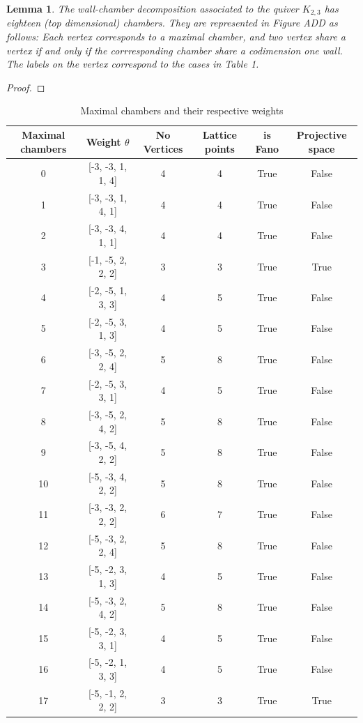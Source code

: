 \documentclass[11pt]{amsart}
\theoremstyle{plain}
\newtheorem{lemma}[theorem]{Lemma}
\theoremstyle{definition}
\begin{document}
\begin{lemma}\label{lemma:WallsDescription}
The wall-chamber decomposition associated to the quiver $K_{2,3}$ has eighteen (top dimensional) chambers. They are represented in Figure ADD as follows: Each vertex corresponds to a maximal chamber, and two vertex share a vertex if and only if the corrresponding chamber share a codimension one wall. The labels on the vertex correspond to the cases in Table 1.    
\end{lemma}
\begin{proof}
    
\end{proof}

\begin{table}[h]
\centering
\caption{
Maximal chambers and their respective weights
}
\renewcommand{\arraystretch}{1.5} 
\label{your-table-label}
\begin{tabular}{| c | c | c | c | c | c|}
\hline
Maximal chambers & Weight $\theta$ & No Vertices & Lattice points & 
is Fano & Projective space
\\ \hline
0 & [-3, -3, 1, 1, 4] & 4 & 4 & True & False \\
1 & [-3, -3, 1, 4, 1] & 4 & 4 & True & False \\
2 & [-3, -3, 4, 1, 1] & 4 & 4 & True & False \\
3 & [-1, -5, 2, 2, 2] & 3 & 3 & True & True \\
4 & [-2, -5, 1, 3, 3] & 4 & 5 & True & False \\
5 & [-2, -5, 3, 1, 3] & 4 & 5 & True & False \\
6 & [-3, -5, 2, 2, 4] & 5 & 8 & True & False \\
7 & [-2, -5, 3, 3, 1] & 4 & 5 & True & False \\
8 & [-3, -5, 2, 4, 2] & 5 & 8 & True & False \\
9 & [-3, -5, 4, 2, 2] & 5 & 8 & True & False \\
10 & [-5, -3, 4, 2, 2] & 5 & 8 & True & False \\
11 & [-3, -3, 2, 2, 2] & 6 & 7 & True & False \\
12 & [-5, -3, 2, 2, 4] & 5 & 8 & True & False \\
13 & [-5, -2, 3, 1, 3] & 4 & 5 & True & False \\
14 & [-5, -3, 2, 4, 2] & 5 & 8 & True & False \\
15 & [-5, -2, 3, 3, 1] & 4 & 5 & True & False \\
16 & [-5, -2, 1, 3, 3] & 4 & 5 & True & False \\
17 & [-5, -1, 2, 2, 2] & 3 & 3 & True & True \\ \hline
\end{tabular}
\end{table}
\newpage
\end{document}
